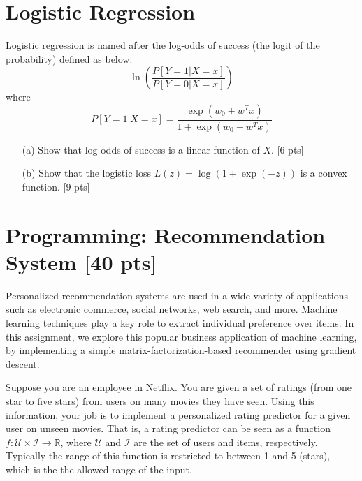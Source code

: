 \documentclass[12pt]{article}
\begin{document}
\section{Logistic Regression} 
Logistic regression is named after the log-odds of success (the logit of the probability) defined as below:
\begin{equation}
\ln \left( \frac{P[Y=1|X=x]}{P[Y=0|X=x]}\right) \nonumber
\end{equation}
where 
\[P[Y=1|X=x]=\frac{\exp(w_0+w^Tx)}{1+\exp(w_0+w^Tx)}\]

\begin{itemize}
\item[(a)] Show that log-odds of success is a linear function of $X$. [6 pts]

\item[(b)] Show that the logistic loss $L(z) = \log \left(  1 + \exp(-z)  \right)$ is a convex function. [9 pts]
\end{itemize}


\section{Programming: Recommendation System [40 pts]}

Personalized recommendation systems are used in a wide variety of
applications such as electronic commerce, social networks, web
search, and more. Machine learning techniques play a key role to
extract individual preference over items. In this assignment, we
explore this popular business application of machine learning, by
implementing a simple matrix-factorization-based recommender using
gradient descent.

Suppose you are an employee in Netflix. You are given a set of
ratings (from one star to five stars) from users on many movies they
have seen. Using this information, your job is to implement a
personalized rating predictor for a given user on unseen movies.
That is, a rating predictor can be seen as a function $f:
\mathcal{U} \times \mathcal{I} \rightarrow \mathbb{R}$, where
$\mathcal{U}$ and $\mathcal{I}$ are the set of users and items,
respectively. Typically the range of this function is restricted to
between 1 and 5 (stars), which is the the allowed range of the
input.
\end{document}
